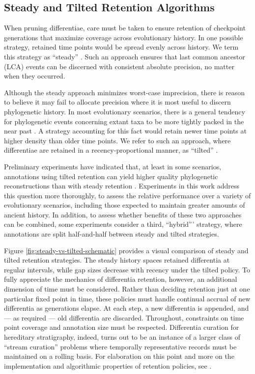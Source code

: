 \subsection{Steady and Tilted Retention Algorithms}



When pruning differentiae, care must be taken to ensure retention of checkpoint generations that maximize coverage across evolutionary history.
In one possible strategy, retained time points would be spread evenly across history.
We term this strategy as ``steady'' \citep{han2005stream,zhao2005generalized}.
Such an approach ensures that last common ancestor (LCA) events can be discerned with consistent absolute precision, no matter when they occurred.

Although the steady approach minimizes worst-case imprecision, there is reason to believe it may fail to allocate precision where it is most useful to discern phylogenetic history.
In most evolutionary scenarios, there is a general tendency for phylogenetic events concerning extant taxa to be more tightly packed in the near past \citep{zhaxybayeva2004cladogenesis}.
A strategy accounting for this fact would retain newer time points at higher density than older time points.
We refer to such an approach, where differentiae are retained in a recency-proportional manner, as ``tilted'' \citep{han2005stream,zhao2005generalized}.

Preliminary experiments have indicated that, at least in some scenarios, annotations using tilted retention can yield higher quality phylogenetic reconstructions than with steady retention \citep{moreno2022hereditary}.
Experiments in this work address this question more thoroughly, to assess the relative performance over a variety of evolutionary scenarios, including those expected to maintain greater amounts of ancient history.
In addition, to assess whether benefits of these two approaches can be combined, some experiments consider a third, ``hybrid''' strategy, where annotations are split half-and-half between steady and tilted strategies.

Figure \ref{fig:steady-vs-tilted-schematic} provides a visual comparison of steady and tilted retention strategies.
The steady history spaces retained differentia at regular intervals, while gap sizes decrease with recency under the tilted policy.
To fully appreciate the mechanics of differentia retention, however, an additional dimension of time must be considered.
Rather than deciding retention just at one particular fixed point in time, these policies must handle continual accrual of new differentia as generations elapse.
At each step, a new differentia is appended, and --- as required --- old differentia are discarded.
Throughout, constraints on time point coverage and annotation size must be respected.
Differentia curation for hereditary stratigraphy, indeed, turns out to be an instance of a larger class of ``stream curation'' problems where temporally representative records must be maintained on a rolling basis.
For elaboration on this point and more on the implementation and algorithmic properties of retention policies, see \citet{moreno2024algorithms}.

